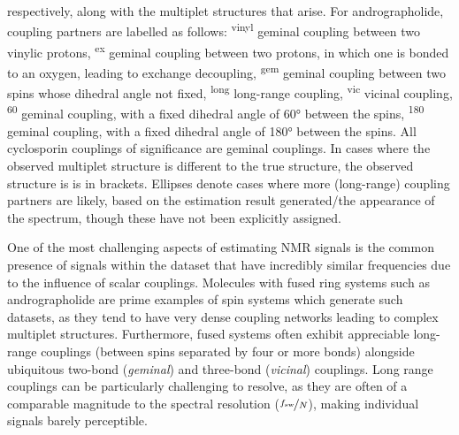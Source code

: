 \begin{table}
{    respectively, along with the multiplet structures that arise.
    For andrographolide, coupling partners are labelled as follows:
    \textsuperscript{vinyl} geminal coupling between two vinylic protons,
    \textsuperscript{ex} geminal coupling between two protons, in which one
    is bonded to an oxygen, leading to exchange decoupling\cite[Section
    2.6.1.5]{Claridge2016},
    \textsuperscript{gem} geminal coupling between two spins whose dihedral angle not fixed,
    \textsuperscript{long} long-range coupling,
    \textsuperscript{vic} vicinal coupling,
    \textsuperscript{60} geminal coupling, with a fixed dihedral angle of
    \ang{60} between the spins,
    \textsuperscript{180} geminal coupling, with a fixed dihedral angle of
    \ang{180} between the spins.
    All cyclosporin couplings of significance are geminal couplings.
    In cases where the observed multiplet structure is different to the true
    structure, the observed structure is is in brackets. Ellipses denote cases
    where more (long-range) coupling partners are likely, based on the
    estimation result generated/the appearance of the spectrum, though these
    have not been explicitly assigned.
}
\label{tab:andro-multiplets}
\end{table}

One of the most challenging aspects of estimating \ac{NMR} signals is
the common presence of signals within the dataset that have incredibly similar
frequencies due to the influence of scalar couplings.
Molecules with fused ring systems such as andrographolide are prime examples of spin
systems which generate such datasets, as they tend to have very dense coupling
networks leading to complex multiplet structures. Furthermore, fused systems often
exhibit appreciable long-range couplings (between spins separated by four or
more bonds) alongside ubiquitous two-bond (\emph{geminal}) and three-bond
(\emph{vicinal}) couplings. Long range couplings can be particularly challenging to
resolve, as they are often of a comparable magnitude to the spectral resolution
($\nicefrac{f_{\mathrm{sw}}}{N}$), making individual signals barely perceptible.

